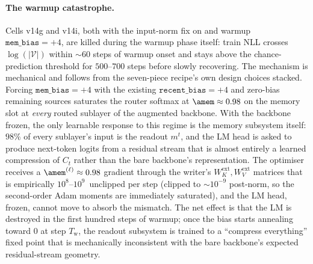 \paragraph{The warmup catastrophe.}
Cells v14g and v14i, both with the input-norm fix on and warmup
$\texttt{mem\_bias}{=}{+4}$, are killed during the warmup phase
itself: train NLL crosses $\log(|\mathcal{V}|)$ within
$\sim 60$ steps of warmup onset and stays above the
chance-prediction threshold for $500$--$700$ steps before slowly
recovering. The mechanism is mechanical and follows from the
seven-piece recipe's own design choices stacked. Forcing
$\texttt{mem\_bias}{=}{+4}$ with the existing
$\texttt{recent\_bias}{=}{+4}$ and zero-bias remaining sources
saturates the router softmax at $\amem \approx 0.98$ on the memory
slot at \emph{every} routed sublayer of the augmented backbone. With
the backbone frozen, the only learnable response to this regime is
the memory subsystem itself: $98\%$ of every sublayer's input is
the readout $m^t$, and the LM head is asked to produce next-token
logits from a residual stream that is almost entirely a learned
compression of $C_t$ rather than the bare backbone's representation.
The optimiser receives a $\amem^{(\ell)} \approx 0.98$ gradient
through the writer's
$W_K^{\text{ext}}, W_V^{\text{ext}}$ matrices that is empirically
$10^8$--$10^9$~unclipped per step (clipped to $\sim 10^{-9}$
post-norm, so the second-order Adam moments are immediately
saturated), and the LM head, frozen, cannot move to absorb the
mismatch. The net effect is that the LM is destroyed in the first
hundred steps of warmup; once the bias starts annealing toward $0$
at step $T_{\text{w}}$, the readout subsystem is trained to a
``compress everything'' fixed point that is mechanically inconsistent
with the bare backbone's expected residual-stream geometry.

